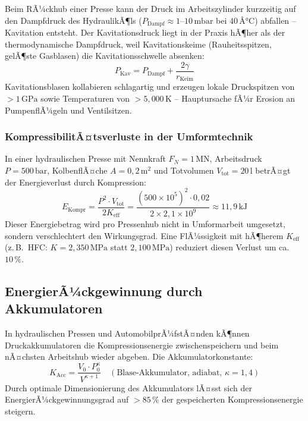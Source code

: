 ﻿\documentclass[a4paper,12pt]{scrreprt}
\theoremstyle{definition}
\begin{document}
Beim RÃ¼ckhub einer Presse kann der Druck im Arbeitszylinder kurzzeitig
auf den Dampfdruck des HydraulikÃ¶ls ($P_{\mathrm{Dampf}} \approx 1$--$10\,\mathrm{mbar}$
bei $40\,Â°\mathrm{C}$) abfallen -- Kavitation entsteht. Der
Kavitationsdruck liegt in der Praxis hÃ¶her als der thermodynamische
Dampfdruck, weil Kavitationskeime (Rauheitsspitzen, gelÃ¶ste Gasblasen)
die Kavitationsschwelle absenken:
\begin{equation}
  P_{\mathrm{Kav}} = P_{\mathrm{Dampf}} + \frac{2\gamma}{r_{\mathrm{Keim}}}
  \label{eq:kavitations_druck}
\end{equation}
Kavitationsblasen kollabieren schlagartig und erzeugen lokale Druckspitzen
von $>1\,\mathrm{GPa}$ sowie Temperaturen von $>5{,}000\,\mathrm{K}$ --
Hauptursache fÃ¼r Erosion an PumpenflÃ¼geln und Ventilsitzen.

\subsubsection{KompressibilitÃ¤tsverluste in der Umformtechnik}

In einer hydraulischen Presse mit Nennkraft $F_N = 1\,\mathrm{MN}$,
Arbeitsdruck $P = 500\,\mathrm{bar}$, KolbenflÃ¤che $A = 0{,}2\,\mathrm{m}^2$
und Totvolumen $V_{\mathrm{tot}} = 20\,\mathrm{l}$ betrÃ¤gt der
Energieverlust durch Kompression:
\begin{equation}
  E_{\mathrm{Kompr}} = \frac{P^2 \cdot V_{\mathrm{tot}}}{2 K_{\mathrm{eff}}}
    = \frac{(500 \times 10^5)^2 \cdot 0{,}02}{2 \times 2{,}1 \times 10^9}
    \approx 11{,}9\,\mathrm{kJ}
  \label{eq:energie_kompr}
\end{equation}
Dieser Energiebetrag wird pro Pressenhub nicht in Umformarbeit umgesetzt,
sondern verschlechtert den Wirkungsgrad. Eine FlÃ¼ssigkeit mit
hÃ¶herem $K_{\mathrm{eff}}$ (z.\,B.\ HFC: $K = 2{,}350\,\mathrm{MPa}$ statt
$2{,}100\,\mathrm{MPa}$) reduziert diesen Verlust um ca.\ $10\,\%$.

\subsection{EnergierÃ¼ckgewinnung durch Akkumulatoren}

In hydraulischen Pressen und AutomobilprÃ¼fstÃ¤nden kÃ¶nnen Druckakkumulatoren
die Kompressionsenergie zwischenspeichern und beim nÃ¤chsten Arbeitshub
wieder abgeben. Die Akkumulatorkonstante:
\begin{equation}
  K_{\mathrm{Acc}} = \frac{V_0 \cdot P_0^\kappa}{V^{\kappa + 1}}
    \quad (\text{Blase-Akkumulator, adiabat, } \kappa = 1{,}4)
  \label{eq:akku_konstante}
\end{equation}
Durch optimale Dimensionierung des Akkumulators lÃ¤sst sich der
EnergierÃ¼ckgewinnungsgrad auf $>85\,\%$ der gespeicherten
Kompressionsenergie steigern.
\end{document}
